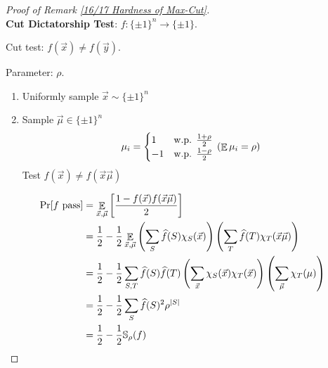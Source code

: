 \begin{proof}[Proof of Remark \ref{16/17 Hardness of Max-Cut}]
    \,\\

    \textbf{Cut Dictatorship Test}:  $ f:\{\pm 1\}^n\rightarrow\{\pm 1\} $.
    
    Cut test:  $ f(\vec{x})\neq f(\vec{y}) $.
    
    Parameter: $ \rho $.
    \begin{enumerate}
        \item Uniformly sample  $ \vec{x}\sim \{\pm 1\}^n $
        \item Sample  $ \vec{\mu}\in \{\pm 1\}^n $
        \[\mu_i=\begin{cases}
            1 & \text{w.p. }\frac{1+\rho}{2}\\
            -1 & \text{w.p. } \frac{1-\rho}{2}
        \end{cases}\,(\mathop\mathbb E\mu_i=\rho)\]
        Test  $ f(\vec{x})\neq f(\vec{x}\vec{\mu}) $ 
    \end{enumerate}  

    \begin{align*}
        \mathrm{Pr}[f\text{ pass}]&=\mathop\mathbb E_{\vec{x},\vec{\mu}}\left[\frac{1-f(\vec{x})f(\vec{x}\vec{\mu})}{2}\right]\\
        &=\frac{1}{2}-\frac{1}{2}\mathop\mathbb E_{\vec{x},\vec{\mu}}\left(\sum_S\widehat{f}(S)\chi_S(\vec{x})\right)\left(\sum_T\widehat{f}(T)\chi_T(\vec{x}\vec{\mu})\right)\\
        &=\frac{1}{2}-\frac{1}{2}\sum_{S,T}\widehat{f}(S)\widehat{f}(T)\left(\sum_{\vec{x}}\chi_S(\vec{x})\chi_T(\vec{x})\right)\left(\sum_{\vec{\mu}}\chi_T(\mu)\right)\\
        &=\frac{1}{2}-\frac{1}{2}\sum_S\widehat{f}(S)^2\rho^{|S|}\\
        &=\frac{1}{2}-\frac{1}{2}{\mathbb S}_\rho(f)
    \end{align*}
    

\end{proof}
